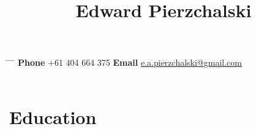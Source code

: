 \documentclass[10pt]{article} %
\begin{document}

\title{Edward Pierzchalski} %

\begin{tabbing}
 \hspace{2cm} \= \hspace{6cm} \= \hspace{2cm} \= \kill
 {\bf Phone} \> +61 404 664 375 \> 
 {\bf Email} \> \href{mailto:e.a.pierzchalski@gmail.com}{e.a.pierzchalski@gmail.com} \\\\
\end{tabbing}
\vspace{-40pt}


\section{Education}
\end{document}
